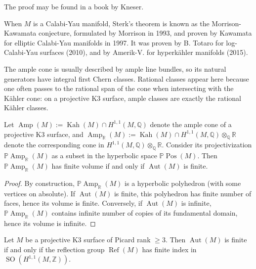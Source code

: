 \noindent
The proof may be found in a book by Kneser.

\medskip\noindent
When $M$ is a Calabi-Yau manifold, Sterk's
theorem is known as the Morrison-Kawamata
conjecture, formulated by Morrison in 1993,
and proven by Kawamata for elliptic Calabi-Yau
manifolds in 1997. It was proven by B. Totaro
for log-Calabi-Yau surfaces (2010), and by
Amerik-V. for hyperkähler manifolds (2015).

\begin{remark}
The ample cone is usually described by ample line
bundles, so its natural generators have integral
first Chern classes. Rational classes appear here
because one often passes to the rational span of
the cone when intersecting with the Kähler cone:
on a projective K3 surface, ample classes are
exactly the rational Kähler classes.
\end{remark}

\begin{lemma}
Let $\operatorname{Amp}(M):=\operatorname{Kah}(M)\cap H^{1,1}(M,\mathbb{Q})$
denote the ample cone of a projective K3
surface, and $\operatorname{Amp}_{\mathbb{R}}(M):=
\operatorname{Kah}(M)\cap H^{1,1}(M,\mathbb{Q})\otimes_{\mathbb{Q}}\mathbb{R}$
denote the corresponding cone in
$H^{1,1}(M,\mathbb{Q})\otimes_{\mathbb{Q}}\mathbb{R}$.
Consider its projectivization
$\mathbb{P}\operatorname{Amp}_{\mathbb{R}}(M)$ as a
subset in the hyperbolic space $\mathbb{P}\operatorname{Pos}(M)$.
Then $\mathbb{P}\operatorname{Amp}_{\mathbb{R}}(M)$
has finite volume if and only if
$\operatorname{Aut}(M)$ is finite.
\end{lemma}

\begin{proof}
By construction,
$\mathbb{P}\operatorname{Amp}_{\mathbb{R}}(M)$ is a
hyperbolic polyhedron (with some vertices on
absolute). If $\operatorname{Aut}(M)$ is finite, this
polyhedron has finite number of faces, hence its
volume is finite. Conversely, if $\operatorname{Aut}(M)$
is infinite, $\mathbb{P}\operatorname{Amp}_{\mathbb{R}}(M)$
contains infinite number of copies of its fundamental
domain, hence its volume is infinite.
\end{proof}

\begin{theorem}[Vinberg]
Let $M$ be a projective K3 surface of
Picard rank $\geq 3$. Then $\operatorname{Aut}(M)$
is finite if and only if the reflection group
$\operatorname{Ref}(M)$ has finite index in
$\operatorname{SO}(H^{1,1}(M,\mathbb{Z}))$.
\end{theorem}

